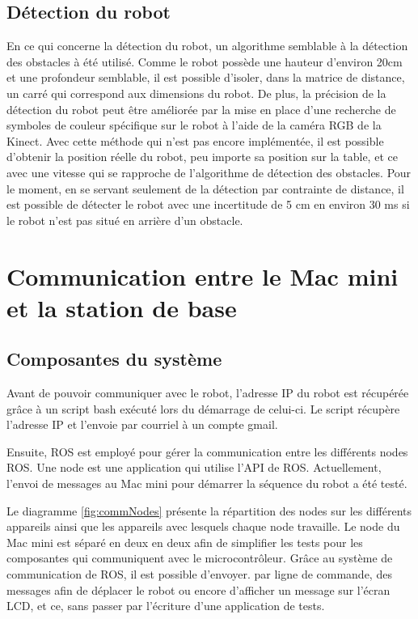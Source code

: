 \subsection{Détection du robot}
En ce qui concerne la détection du robot, un algorithme semblable à la détection des obstacles à été utilisé. Comme le robot possède une hauteur d'environ 20cm et une profondeur semblable, il est possible d'isoler, dans la matrice de distance, un carré qui correspond aux dimensions du robot. De plus, la précision de la détection du robot peut être améliorée par la mise en place d'une recherche de symboles de couleur spécifique sur le robot à l'aide de la caméra RGB de la Kinect. Avec cette méthode qui n'est pas encore implémentée, il est possible d'obtenir la position réelle du robot, peu importe sa position sur la table, et ce avec une vitesse qui se rapproche de l'algorithme de détection des obstacles. Pour le moment, en se servant seulement de la détection par contrainte de distance, il est possible de détecter le robot avec une incertitude de 5 cm en environ 30 ms si le robot n'est pas situé en arrière d'un obstacle.

\section{Communication entre le Mac mini et la station de base}
\subsection{Composantes du système}
Avant de pouvoir communiquer avec le robot, l’adresse IP du robot est récupérée grâce à un script bash exécuté lors du démarrage de celui-ci. Le script récupère l’adresse IP et l’envoie par courriel à un compte gmail.

Ensuite, ROS est employé pour gérer la communication entre les différents nodes ROS. Une node est une application qui utilise l’API de ROS. Actuellement, l’envoi de messages au Mac mini pour démarrer la séquence du robot a été testé.

Le diagramme \ref{fig:commNodes} présente la répartition des nodes sur les différents appareils ainsi que les appareils avec lesquels chaque node travaille. Le node du Mac mini est séparé en deux en deux afin de simplifier les tests pour les composantes qui communiquent avec le microcontrôleur. Grâce au système de communication de ROS, il est possible d'envoyer. par ligne de commande, des messages afin de déplacer le robot ou encore d'afficher un message sur l’écran LCD, et ce, sans passer par l’écriture d’une application de tests.

